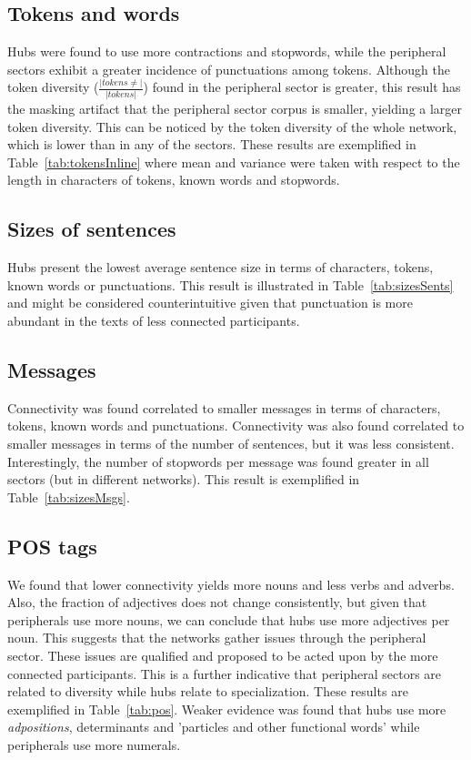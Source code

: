 \documentclass[review]{elsarticle}
\begin{document}
\subsection{Tokens and words}\label{subsec:tw}
Hubs were found to use more contractions and stopwords, while the peripheral sectors exhibit a greater incidence of punctuations among tokens.
Although the token diversity ($\frac{|tokens \neq|}{|tokens|}$) found in the peripheral sector is greater,
this result has the masking artifact that the peripheral sector corpus is smaller, yielding a larger token diversity.
This can be noticed by the token diversity of the whole network, which is lower than in any of the sectors.
These results are exemplified in Table~\ref{tab:tokensInline}
where mean and variance were taken with respect to the length in characters of tokens, known words and stopwords.

\FloatBarrier

\subsection{Sizes of sentences}\label{subsec:ss}
Hubs present the lowest average sentence size
in terms of characters, tokens, known words or punctuations.
This result is illustrated in Table~\ref{tab:sizesSents}
and might be considered counterintuitive given that punctuation
is more abundant in the texts of less connected participants.

\FloatBarrier

\subsection{Messages}\label{subsec:mm}
Connectivity was found correlated to smaller messages in terms of characters, tokens, known words and punctuations.
Connectivity was also found correlated to smaller messages in terms of the number of sentences, but
it was less consistent.
Interestingly, the number of stopwords per message was found greater in all sectors (but in different networks).
This result is exemplified in Table~\ref{tab:sizesMsgs}.

\FloatBarrier

\subsection{POS tags}\label{subsec:pos}
We found that lower connectivity yields more nouns and less verbs and adverbs.
Also, the fraction of adjectives does not change consistently,
but given that peripherals use more nouns,
we can conclude that hubs use more adjectives per noun.
This suggests that the networks gather issues
through the peripheral sector. 
These issues are qualified and proposed to be acted upon
by the more connected participants.
This is a further indicative that peripheral sectors
are related to diversity while hubs relate to specialization.
These results are exemplified in Table~\ref{tab:pos}.
Weaker evidence was found that hubs use more \emph{adpositions},
determinants and 'particles and other functional words' while
peripherals use more numerals.

\FloatBarrier
\end{document}
